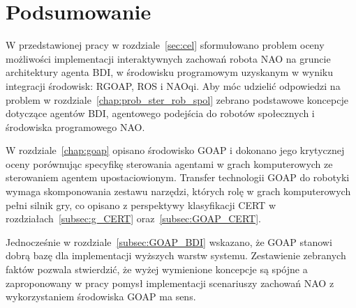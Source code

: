 \chapter{Podsumowanie}
\label{chap:podsumowanie}

W przedstawionej pracy w rozdziale~\ref{sec:cel} sformułowano problem oceny możliwości implementacji interaktywnych zachowań robota NAO na gruncie architektury agenta BDI, w środowisku programowym uzyskanym w wyniku integracji środowisk: RGOAP, ROS i NAOqi. 
Aby móc udzielić odpowiedzi na problem w rozdziale~\ref{chap:prob_ster_rob_spol} zebrano podstawowe koncepcje dotyczące agentów BDI, agentowego podejścia do robotów społecznych i środowiska programowego NAO.

W rozdziale~\ref{chap:goap} opisano środowisko GOAP i dokonano jego krytycznej oceny porównując specyfikę sterowania agentami w grach komputerowych ze sterowaniem agentem upostaciowionym. Transfer technologii GOAP do robotyki wymaga skomponowania zestawu narzędzi, których rolę w grach komputerowych pełni silnik gry, co opisano z perspektywy klasyfikacji CERT w rozdziałach~\ref{subsec:g_CERT} oraz~\ref{subsec:GOAP_CERT}. 

Jednocześnie w rozdziale~\ref{subsec:GOAP_BDI} wskazano, że GOAP stanowi dobrą bazę dla implementacji wyższych warstw systemu. Zestawienie zebranych faktów pozwala stwierdzić, że wyżej wymienione koncepcje są spójne a zaproponowany w pracy pomysł implementacji scenariuszy zachowań NAO z wykorzystaniem środowiska GOAP ma sens.



